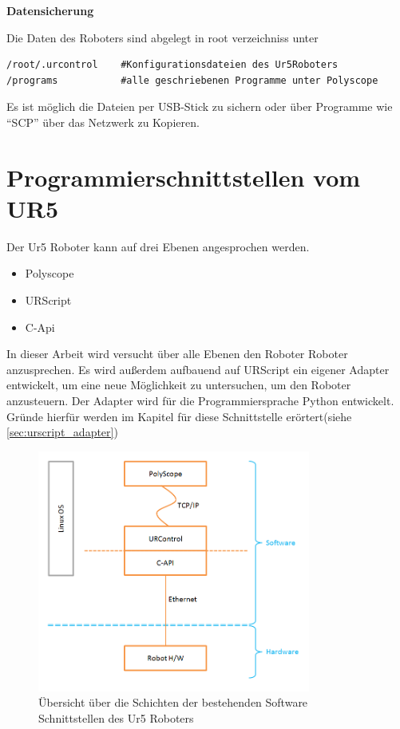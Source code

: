 \textbf{Datensicherung}

Die Daten des Roboters sind abgelegt in root verzeichniss unter 

\begin{lstlisting}[caption={Pfade Der UR5 Relevanten Dateien}, label=lst:ur5data ,captionpos=b] 
/root/.urcontrol    #Konfigurationsdateien des Ur5Roboters
/programs   		#alle geschriebenen Programme unter Polyscope
\end{lstlisting}

Es ist möglich die Dateien per USB-Stick zu sichern oder über Programme wie ``\ac{SCP}'' über das Netzwerk zu Kopieren.

\section{Programmierschnittstellen vom UR5}
\label{sec:programm_api_uebersicht_gru}

Der Ur5 Roboter kann auf drei Ebenen angesprochen werden.\\

\begin{itemize}
\item Polyscope
\item URScript
\item C-Api
\end{itemize}

In dieser Arbeit wird versucht über alle Ebenen den Roboter Roboter anzusprechen.
Es wird außerdem aufbauend auf URScript ein eigener Adapter entwickelt, um eine neue Möglichkeit zu untersuchen, um den Roboter anzusteuern.
Der Adapter wird für die Programmiersprache Python entwickelt. Gründe hierfür werden im Kapitel für diese Schnittstelle erörtert(siehe \ref{sec:urscript_adapter})

\begin{figure}[H]
  \centering
    \includegraphics[width=0.8\textwidth]{pic/ur_programming_levels.png}
      \caption[Schichten der Software Schnittstellen]{Übersicht über die
      Schichten der bestehenden Software Schnittstellen des Ur5 Roboters}
      \label{fig:schnittstellen_schichten}
\end{figure}

